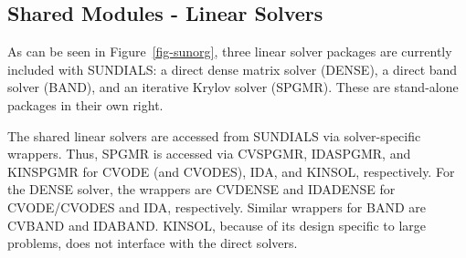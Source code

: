 \subsection{Shared Modules - Linear Solvers}

As can be seen in \mbox{Figure \ref{fig-sunorg}}, three linear solver
packages are currently included with SUNDIALS: a direct dense matrix solver
(DENSE), a direct band solver (BAND), and an iterative Krylov solver
(SPGMR). These are stand-alone packages in their own right.

The shared linear solvers are accessed from SUNDIALS via
solver-specific wrappers. 
Thus, SPGMR is accessed via CVSPGMR, IDASPGMR, and
KINSPGMR for CVODE (and CVODES), IDA, and KINSOL, respectively. For the
DENSE solver, the wrappers are CVDENSE and IDADENSE for CVODE/CVODES and
IDA, respectively. Similar wrappers for BAND are CVBAND and IDABAND. KINSOL,
because of its design specific to large problems, does not interface with
the direct solvers.
